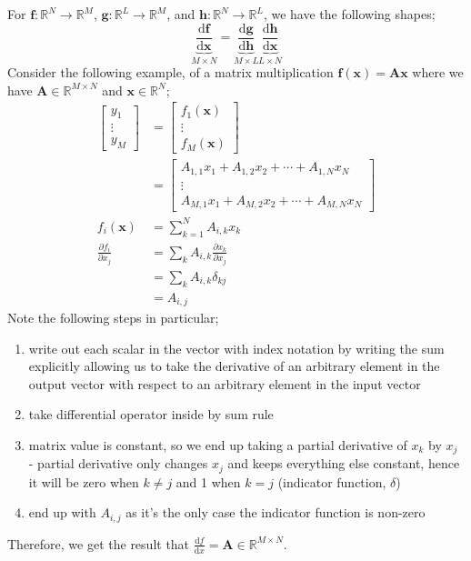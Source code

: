 \documentclass[a4paper, 12pt]{article}
\newcommand{\pdif}[2]{\frac{\partial #1}{\partial #2}}
\newcommand{\dif}[2]{\frac{\mathrm{d}#1}{\mathrm{d}#2}}
\newcommand{\summation}[2]{\sum\limits_{#1}^{#2}}
\newcommand{\mat}[1]{\boldsymbol{#1}}
\renewcommand{\vec}[1]{\boldsymbol{#1}}
\begin{document}
            For $\vec{f}: \mathbb{R}^N \to \mathbb{R}^M$, $\vec{g}: \mathbb{R}^L \to \mathbb{R}^M$, and $\vec{h}: \mathbb{R}^N \to \mathbb{R}^L$, we have the following shapes;
            $$\underbrace{\dif{\vec{f}}{\vec{x}}}_{M \times N} = \underbrace{\dif{\vec{g}}{\vec{h}}}_{M \times L} \underbrace{\dif{\vec{h}}{\vec{x}}}_{L \times N}$$
            Consider the following example, of a matrix multiplication $\vec{f}(\vec{x}) = \mat{A}\vec{x}$ where we have $\mat{A} \in \mathbb{R}^{M \times N}$ and $\vec{x} \in \mathbb{R}^N$;
            \begin{align}
                \begin{bmatrix}
                    y_1 \\ \vdots \\ y_M
                \end{bmatrix} & = \begin{bmatrix}
                    f_1(\vec{x}) \\ \vdots \\ f_M(\vec{x})
                \end{bmatrix} \\
                & = \begin{bmatrix}
                    A_{1, 1}x_1 + A_{1, 2}x_2 + \cdots + A_{1, N}x_N \\
                    \vdots \\
                    A_{M, 1}x_1 + A_{M, 2}x_2 + \cdots + A_{M, N}x_N
                \end{bmatrix} \\
                f_i(\vec{x}) & = \summation{k = 1}{N} A_{i, k}x_k \\
                \pdif{f_i}{x_j} & = \summation{k}{} A_{i, k} \pdif{x_k}{x_j} \\
                & = \summation{k}{} A_{i, k} \delta_{kj} \\
                & = A_{i, j}
            \end{align}
            Note the following steps in particular;
            \begin{enumerate}[(1)]
                \itemsep0em
                \setcounter{enumi}{2}
                \item write out each scalar in the vector with index notation by writing the sum explicitly allowing us to take the derivative of an arbitrary element in the output vector with respect to an arbitrary element in the input vector
                \item take differential operator inside by sum rule
                \item matrix value is constant, so we end up taking a partial derivative of $x_k$ by $x_j$ - partial derivative only changes $x_j$ and keeps everything else constant, hence it will be zero when $k \neq j$ and 1 when $k = j$ (indicator function, $\delta$)
                \item end up with $A_{i, j}$ as it's the only case the indicator function is non-zero
            \end{enumerate}
            Therefore, we get the result that $\dif{f}{x} = \mat{A} \in \mathbb{R}^{M \times N}$.
            \medskip
\end{document}
